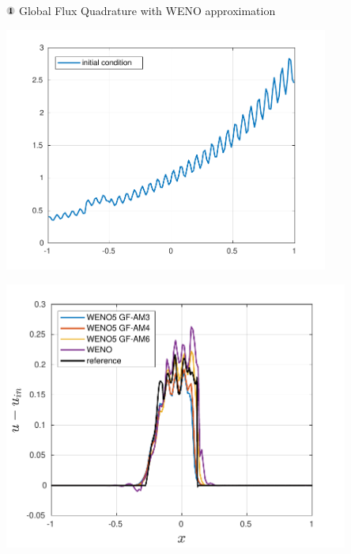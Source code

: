 \begin{frame}[t]{\includegraphics[width=0.3cm]{circle1} Global Flux Quadrature  with WENO approximation}
{	
	\begin{minipage}{0.5\textwidth}
		\centering\includegraphics[width=0.8\textwidth]{../figs/WENO-FD/figures/Burgers/perturbations/initial_cond_DISC_n150} 
	\end{minipage}\hfill
	\begin{minipage}{0.5\textwidth}
		\centering\includegraphics[width=0.85\textwidth]{../figs/WENO-FD/figures/Burgers/perturbations/weno5_AM_DISC_n150} 
	\end{minipage}
}

\end{frame}
